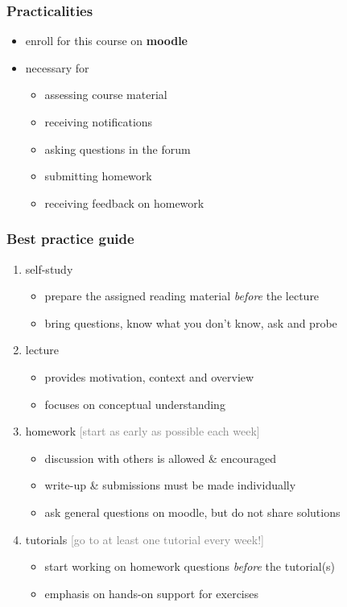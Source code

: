 \documentclass[fleqn,10pt,serif,xcolor=svgnames,xcolor=table,aspectratio=169]{beamer}
\newcommand{\mycom}[1]{\hfill {\mygray{[#1]}}}
\newcommand{\mygray}[1]{\textcolor{gray}{#1}}
\begin{document}
\begin{frame}
  \frametitle{Practicalities}
  \begin{itemize}
    \item enroll for this course on \textbf{moodle}
    \item necessary for
    \begin{itemize}
      \item assessing course material
      \item receiving notifications
      \item asking questions in the forum
      \item submitting homework
      \item receiving feedback on homework
    \end{itemize}
  \end{itemize}
\end{frame}

\begin{frame}
  \frametitle{Best practice guide}
  \begin{enumerate}
    \item self-study
    \begin{itemize}
      \item prepare the assigned reading material \emph{before} the lecture
      \item bring questions, know what you don't know, ask and probe
    \end{itemize}
    \item lecture
    \begin{itemize}
      \item provides motivation, context and overview
      \item focuses on conceptual understanding
    \end{itemize}
    \item homework \hfill \mycom{start as early as possible each week}
    \begin{itemize}
      \item discussion with others is allowed \& encouraged
      \item write-up \& submissions must be made individually
      \item ask general questions on moodle, but do not share solutions
    \end{itemize}
    \item tutorials \hfill \mycom{go to at least one tutorial every week!}
    \begin{itemize}
      \item start working on homework questions \emph{before} the tutorial(s)
      \item emphasis on hands-on support for exercises
    \end{itemize}
  \end{enumerate}
\end{frame}
\end{document}
